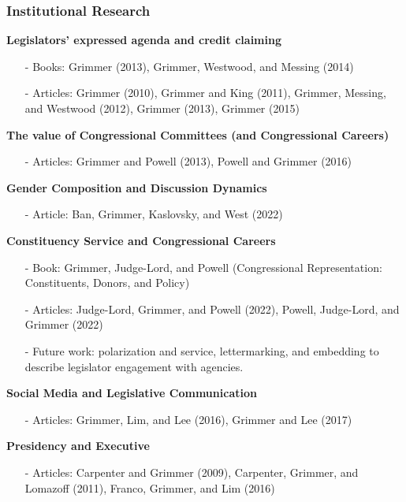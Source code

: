 \documentclass[xcolor=dvipsnames]{beamer}
\begin{document}
\begin{frame}
\frametitle{Institutional Research}

\begin{tiny} 
\textbf{Legislators' expressed agenda and credit claiming }

\begin{itemize}
	\item[-] Books: Grimmer (2013), Grimmer, Westwood, and Messing (2014)
	\item[-] Articles: Grimmer (2010), Grimmer and King (2011), Grimmer, Messing, and Westwood (2012), Grimmer (2013), Grimmer (2015)
\end{itemize}

\textbf{The value of Congressional Committees (and Congressional Careers)}
\begin{itemize}
	\item[-] Articles: Grimmer and Powell (2013), Powell and Grimmer (2016) 
\end{itemize}


\textbf{Gender Composition and Discussion Dynamics}
\begin{itemize}
	\item[-] Article: Ban, Grimmer, Kaslovsky, and West (2022)
\end{itemize}

\textbf{Constituency Service and Congressional Careers}
\begin{itemize}
	\item[-] Book: Grimmer, Judge-Lord, and Powell (Congressional Representation: Constituents, Donors, and Policy)
	\item[-] Articles: Judge-Lord, Grimmer, and Powell (2022), Powell, Judge-Lord, and Grimmer (2022) 
	\item[-] Future work: polarization and service, lettermarking, and embedding to describe legislator engagement with agencies.
\end{itemize}

\textbf{Social Media and Legislative Communication}
\begin{itemize}
	\item[-] Articles: Grimmer, Lim, and Lee (2016), Grimmer and Lee (2017)
\end{itemize} 

\textbf{Presidency and Executive} 
\begin{itemize}
	\item[-] Articles: Carpenter and Grimmer (2009), Carpenter, Grimmer, and Lomazoff (2011), Franco, Grimmer, and Lim (2016) 
\end{itemize}


\end{tiny}
\end{frame}
\end{document}
